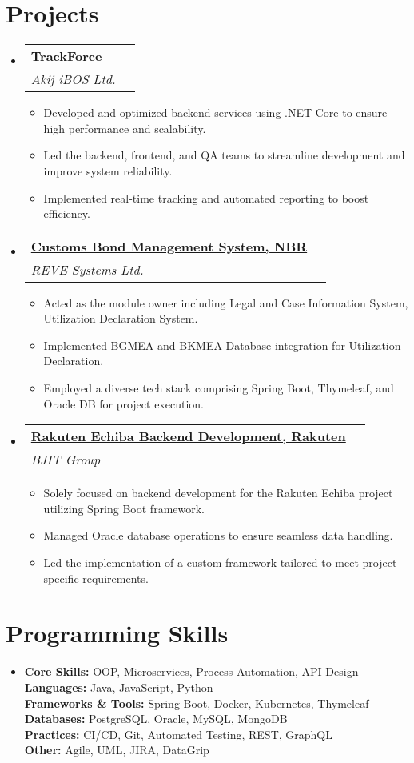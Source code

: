\documentclass[a4paper,11pt]{article}
\makeatletter
\newcommand{\resumeItem}[1]{\item[$\bullet$] \small{#1 \vspace{-2pt}}}
\newcommand{\resumeSubHeadingListStart}{\begin{itemize}[leftmargin=0pt, label={}]}
\newcommand{\resumeSubHeadingListEnd}{\end{itemize}}
\newcommand{\resumeItemListStart}{\begin{itemize}}
\newcommand{\resumeItemListEnd}{\end{itemize}\vspace{-5pt}}
\newcommand{\resumeSubheading}[5]{
    \vspace{-1pt}\item
    \begin{tabular*}{1\textwidth}{l@{\extracolsep{\fill}}r}
    \textbf{\href{#4}{#1}} & #2 \\
    \textit{\small#3} & \textit{\small #5} \\
    \end{tabular*}\vspace{-5pt}
}
\makeatother
\begin{document}
    \section{Projects}
    \resumeSubHeadingListStart
    \resumeSubheading
    {TrackForce}{}
    {Akij iBOS Ltd.}{https://app.trackforce.io/}{}
    \resumeItemListStart
    \resumeItem{Developed and optimized backend services using .NET Core to ensure high performance and scalability.}
    \resumeItem{Led the backend, frontend, and QA teams to streamline development and improve system reliability.}
    \resumeItem{Implemented real-time tracking and automated reporting to boost efficiency.}
    \resumeItemListEnd
    \resumeSubheading
    {Customs Bond Management System, NBR}{}
    {REVE Systems Ltd.}{https://cusbond.gov.bd/}{}
    \resumeItemListStart
    \resumeItem{Acted as the module owner including Legal and Case Information System, Utilization Declaration System.}
    \resumeItem{Implemented BGMEA and BKMEA Database integration for Utilization Declaration.}
    \resumeItem{Employed a diverse tech stack comprising Spring Boot, Thymeleaf, and Oracle DB for project execution.}
    \resumeItemListEnd
    \resumeSubheading
    {Rakuten Echiba Backend Development, Rakuten}{}
    {BJIT Group}{https://www.rakuten.co.jp/}{}
    \resumeItemListStart
    \resumeItem{Solely focused on backend development for the Rakuten Echiba project utilizing Spring Boot framework.}
    \resumeItem{Managed Oracle database operations to ensure seamless data handling.}
    \resumeItem{Led the implementation of a custom framework tailored to meet project-specific requirements.}
    \resumeItemListEnd
    \resumeSubHeadingListEnd



    \section{Programming Skills}
    \resumeSubHeadingListStart
    \item{
        \textbf{Core Skills:} OOP, Microservices, Process Automation, API Design \\
        \textbf{Languages:} Java, JavaScript, Python \\
        \textbf{Frameworks \& Tools:} Spring Boot, Docker, Kubernetes, Thymeleaf \\
        \textbf{Databases:} PostgreSQL, Oracle, MySQL, MongoDB \\
        \textbf{Practices:} CI/CD, Git, Automated Testing, REST, GraphQL \\
        \textbf{Other:} Agile, UML, JIRA, DataGrip
    }
    \resumeSubHeadingListEnd
\end{document}
